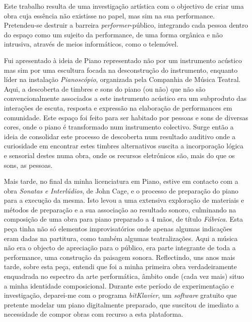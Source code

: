 \documentclass[../main.tex]{subfiles}
\begin{document}
Este trabalho resulta de uma investigação artística com o objectivo de criar uma obra cuja essência não existisse no papel, mas sim na sua performance. Pretendeu-se destruir a barreira \textsl{performer}-público, integrando cada pessoa dentro do espaço como um sujeito da performance, de uma forma orgânica e não intrusiva, através de meios informáticos, como o telemóvel.

Fui apresentado à ideia de Piano representado não por um instrumento acústico mas sim por uma escultura focada na desconstrução do instrumento, enquanto líder na instalação \textsl{Pianoscópio}, organizada pela Companhia de Música Teatral. Aqui, a descoberta de timbres e sons do piano (ou não) que não são convencionalmente associados a este instrumento acústico era um subproduto das interações de escuta, resposta e expressão na elaboração de performances em comunidade. Este espaço foi feito para ser habitado por pessoas e sons de diversas cores, onde o piano é transformado num instrumento colectivo\cite{cmt2021,vaz2016}. Surge então a ideia de consolidar este processo de descoberta num resultado auditivo onde a curiosidade em encontrar estes timbres alternativos suscita a incorporação lógica e sensorial destes numa obra, onde os recursos eletrónicos são, mais do que os sons, as pessoas.

Mais tarde, no final da minha licenciatura em Piano, estive em contacto com a obra \textsl{Sonatas e Interlúdios}, de John Cage, e o processo de preparação do piano para a execução da mesma. Isto levou a uma extensiva exploração de materiais e métodos de preparação e a sua associação ao resultado sonoro, culminando na composição de uma obra para piano preparado a 4 mãos, de título \textsl{Fábrica}. Esta peça tinha não só elementos improvisatórios onde apenas algumas indicações eram dadas na partitura, como também algumas teatralizações. Aqui a música não era o objecto de apreciação para o público, era parte integrante de toda a performance, uma construção da paisagem sonora. Reflectindo, uns anos mais tarde, sobre esta peça, entendi que foi a minha primeira obra verdadeiramente enquadrada no espectro da arte performática, âmbito onde (cada vez mais) situo a minha identidade composicional. Durante este período de experimentação e investigação, deparei-me com o programa \textsl{bitKlavier}, um \textsl{software} gratuito que pretente modelar um piano digitalmente preparado, que suscitou de imediato a necessidade de compor obras com recurso a esta plataforma.
\end{document}
